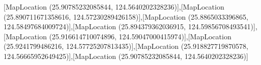 [MapLocation (25.90785232085844, 124.5640202328236)],[MapLocation (25.890711671358616, 124.57230289426158)],[MapLocation (25.8865033396865, 124.58497684009724)],[MapLocation (25.894379362036915, 124.59856708493541)],[MapLocation (25.916614710074896, 124.59047000415974)],[MapLocation (25.9241799486216, 124.57725207813435)],[MapLocation (25.918827719870578, 124.56665952649425)],[MapLocation (25.90785232085844, 124.5640202328236)]